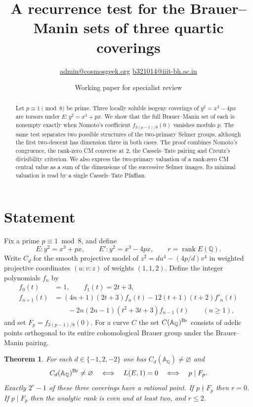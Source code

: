 \documentclass[11pt]{article}
\title{A recurrence test for the Brauer--Manin sets of three quartic coverings}
\author{\small\href{mailto:admin@cosmosgeek.org}{admin@cosmosgeek.org}\quad
\href{mailto:b321014@iiit-bh.ac.in}{b321014@iiit-bh.ac.in}}
\date{Working paper for specialist review}
\newcommand{\Q}{\mathbb Q}\newcommand{\Z}{\mathbb Z}\newcommand{\F}{\mathbb F}
\newcommand{\A}{\mathbb A}\newcommand{\Sha}{\mathop{\mathrm{Sha}}\nolimits}
\newtheorem{theorem}{Theorem}[section]\newtheorem{lemma}[theorem]{Lemma}\newtheorem{corollary}[theorem]{Corollary}
\begin{document}
\maketitle
\begin{abstract}
Let $p\equiv1\pmod 8$ be prime. Three locally soluble isogeny coverings of $y^2=x^3-4px$ are torsors under $E:y^2=x^3+px$. We show that the full Brauer--Manin set of each is nonempty exactly when Nomoto's coefficient $f_{3(p-1)/8}(0)$ vanishes modulo $p$. The same test separates two possible structures of the two-primary Selmer groups, although the first two-descent has dimension three in both cases. The proof combines Nomoto's congruence, the rank-zero CM converse at $2$, the Cassels--Tate pairing and Creutz's divisibility criterion. We also express the two-primary valuation of a rank-zero CM central value as a sum of the dimensions of the successive Selmer images. Its minimal valuation is read by a single Cassels--Tate Pfaffian.
\end{abstract}

\section{Statement}
Fix a prime $p\equiv1\bmod8$, and define
\[
 E:y^2=x^3+px,\qquad E':y^2=x^3-4px,\qquad r=\operatorname{rank}E(\Q).
\]
Write $C_d$ for the smooth projective model of $z^2=du^4-(4p/d)v^4$ in weighted projective coordinates $(u:v:z)$ of weights $(1,1,2)$. Define the integer polynomials $f_n$ by
\begin{align*}
 f_0(t)&=1,\qquad f_1(t)=2t+3,\\
 f_{n+1}(t)&=(4n+1)(2t+3)f_n(t)-12(t+1)(t+2)f'_n(t)\\
 &\qquad -2n(2n-1)(t^2+3t+3)f_{n-1}(t)\qquad(n\ge1),
\end{align*}
and set $F_p=f_{3(p-1)/8}(0)$. For a curve $C$ the set $C(\A_{\Q})^{\Br}$ consists of adelic points orthogonal to its entire cohomological Brauer group under the Brauer--Manin pairing.

\begin{theorem}\label{main}
For each $d\in\{-1,2,-2\}$ one has $C_d(\A_{\Q})\ne\varnothing$ and
\[
 C_d(\A_{\Q})^{\Br}\ne\varnothing
 \quad\Longleftrightarrow\quad L(E,1)=0
 \quad\Longleftrightarrow\quad p\mid F_p .
\]
Exactly $2^r-1$ of these three coverings have a rational point. If $p\nmid F_p$ then $r=0$. If $p\mid F_p$ then the analytic rank is even and at least two, and $r\le2$.
\end{theorem}
\end{document}
